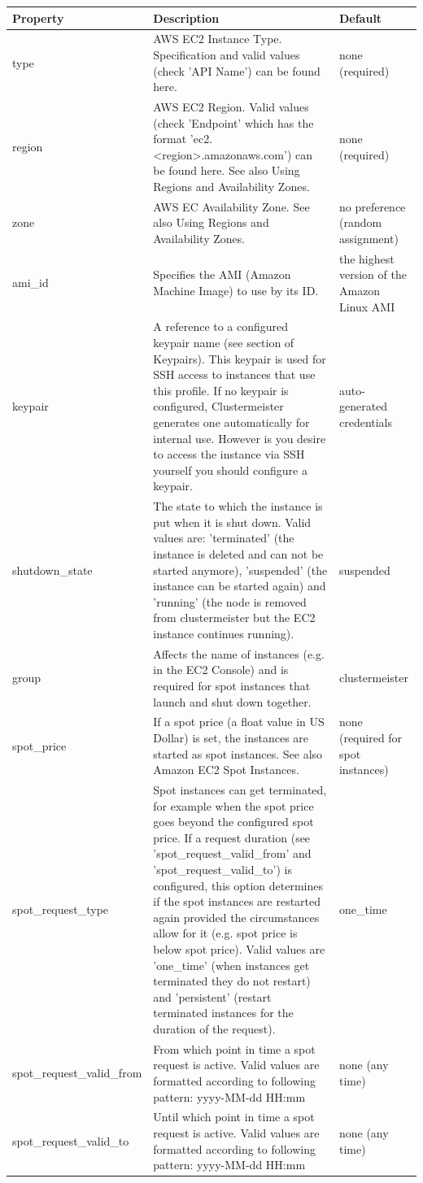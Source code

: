 \documentclass{article}
\begin{document}
\begin{longtable}{|l| p{6cm} | p{3cm}|}
\hline
Property & Description & Default\\ \hline
type & AWS EC2 Instance Type. Specification and valid values (check 'API Name') can be found here. & none (required)\\ \hline
region & AWS EC2 Region. Valid values (check 'Endpoint' which has the format 'ec2.<region>.amazonaws.com') can be found here. See also Using Regions and Availability Zones. & none (required)\\ \hline
zone & AWS EC Availability Zone. See also Using Regions and Availability Zones. & no preference (random assignment)\\ \hline
ami\_id & Specifies the AMI (Amazon Machine Image) to use by its ID. & the highest version of the Amazon Linux AMI\\ \hline
keypair & A reference to a configured keypair name (see section of Keypairs). This keypair is used for SSH access to instances that use this profile. If no keypair is configured, Clustermeister generates one automatically for internal use. However is you desire to access the instance via SSH yourself you should configure a keypair. & auto-generated credentials\\ \hline
shutdown\_state & The state to which the instance is put when it is shut down. Valid values are: 'terminated' (the instance is deleted and can not be started anymore), 'suspended' (the instance can be started again) and 'running' (the node is removed from clustermeister but the EC2 instance continues running). & suspended\\ \hline
group & Affects the name of instances (e.g. in the EC2 Console) and is required for spot instances that launch and shut down together. & clustermeister\\ \hline
spot\_price & If a spot price (a float value in US Dollar) is set, the instances are started as spot instances. See also Amazon EC2 Spot Instances. & none (required for spot instances)\\ \hline
spot\_request\_type & Spot instances can get terminated, for example when the spot price goes beyond the configured spot price. If a request duration (see 'spot\_request\_valid\_from' and 'spot\_request\_valid\_to') is configured, this option determines if the spot instances are restarted again provided the circumstances allow for it (e.g. spot price is below spot price). Valid values are 'one\_time' (when instances get terminated they do not restart) and 'persistent' (restart terminated instances for the duration of the request). & one\_time\\ \hline
spot\_request\_valid\_from & From which point in time a spot request is active. Valid values are formatted according to following pattern: yyyy-MM-dd HH:mm & none (any time)\\ \hline
spot\_request\_valid\_to & Until which point in time a spot request is active. Valid values are formatted according to following pattern: yyyy-MM-dd HH:mm & none (any time) \\ \hline
\end{longtable}
\end{document}
